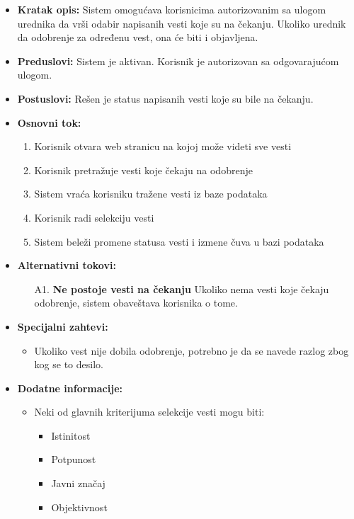 \documentclass{article}
\begin{document}
\begin{itemize}
    \item \textbf{Kratak opis:} Sistem omogućava korisnicima autorizovanim sa ulogom urednika da vrši odabir napisanih vesti koje su na čekanju. Ukoliko urednik da odobrenje za određenu vest, ona će biti i objavljena.
    \item \textbf{Preduslovi:} Sistem je aktivan. Korisnik je autorizovan sa odgovarajućom ulogom. 
    \item \textbf{Postuslovi:} Rešen je status napisanih vesti koje su bile na čekanju.
    \item \textbf{Osnovni tok:}
        \begin{enumerate}
            \item Korisnik otvara web stranicu na kojoj može videti sve vesti
            \item Korisnik pretražuje vesti koje čekaju na odobrenje
            \item Sistem vraća korisniku tražene vesti iz baze podataka
            \item Korisnik radi selekciju vesti
            \item Sistem beleži promene statusa vesti i izmene čuva u bazi podataka
        \end{enumerate}
    \item \textbf{Alternativni tokovi:}
        \begin{itemize}
            \item[A1.] \textbf{Ne postoje vesti na čekanju} Ukoliko nema vesti koje čekaju odobrenje, sistem obaveštava korisnika o tome. 
        \end{itemize}
    \item \textbf{Specijalni zahtevi:}
        \begin{itemize}
			\item Ukoliko vest nije dobila odobrenje, potrebno je da se navede razlog zbog kog se to desilo.
		\end{itemize}
	\item \textbf{Dodatne informacije:}
        \begin{itemize}
            \item Neki od glavnih kriterijuma selekcije vesti mogu biti:
                \begin{itemize}
                    \item Istinitost
                    \item Potpunost
                    \item Javni značaj 
                    \item Objektivnost
                \end{itemize}
        \end{itemize}
\end{itemize}
\end{document}
